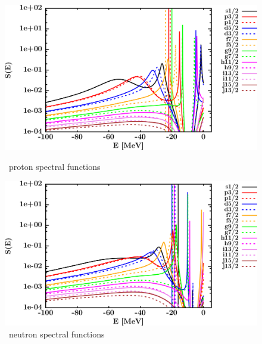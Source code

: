 \begin{figure}[hbtp]
    \centering
    \begin{minipage}{0.42\textwidth}
        \centering
        \includegraphics[width=\textwidth]{figures/sn124_protonSpectralFunctions.png}
        \caption*{\snFour\ proton spectral functions}
        \label{DOMFitData_sn124_proton_spectralFunctions}
    \end{minipage}\hspace{6pt}
    \begin{minipage}{0.42\textwidth}
        \centering
        \includegraphics[width=\linewidth]{figures/sn124_neutronSpectralFunctions.png}
        \caption*{\snFour\ neutron spectral functions}
        \label{DOMFitData_sn124_neutron_spectralFunctions}
    \end{minipage}
\end{figure}
\afterpage{\clearpage}
